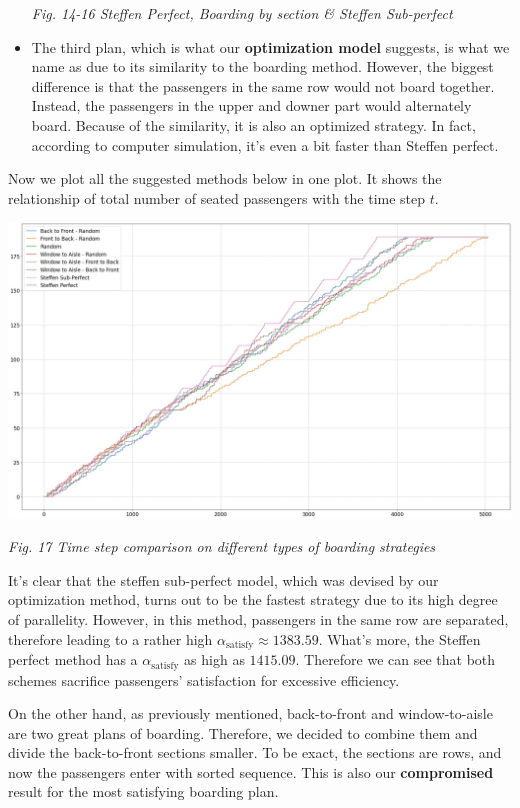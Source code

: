 \documentclass{article}
\theoremstyle{definition}
\theoremstyle{remark}
\numberwithin{equation}{section}
\begin{document}
\begin{itemize}
\begin{center}
			\small\textit{Fig. 14-16 Steffen Perfect, Boarding by section \& Steffen Sub-perfect}
		\end{center}

		\item The third plan, which is what our \textbf{optimization model} suggests, is what we name as  due to its similarity to the  boarding method. However, the biggest difference is that the passengers in the same row would not board together. Instead, the passengers in the upper and downer part would alternately board. Because of the similarity, it is also an optimized strategy. In fact, according to computer simulation, it's even a bit faster than Steffen perfect.
	\end{itemize}
	Now we plot all the suggested methods below in one plot. It shows the relationship of total number of seated passengers with the time step \(t\).
	\begin{center}
		\includegraphics[width = 14cm]{speed graphs on various types.jpg}

		\small\textit{Fig. 17 Time step comparison on different types of boarding strategies}
	\end{center}
	It's clear that the steffen sub-perfect model, which was devised by our optimization method, turns out to be the fastest strategy due to its high degree of parallelity. However, in this method, passengers in the same row are separated, therefore leading to a rather high \(\alpha_{\mathrm{satisfy}}\approx 1383.59\). What's more, the Steffen perfect method has a \(\alpha_{\mathrm{satisfy}}\) as high as \(1415.09\). Therefore we can see that both schemes sacrifice passengers' satisfaction for excessive efficiency.

	On the other hand, as previously mentioned, back-to-front and window-to-aisle are two great plans of boarding. Therefore, we decided to combine them and divide the back-to-front sections smaller. To be exact, the sections are rows, and now the passengers enter with sorted sequence. This is also our \textbf{compromised} result for the most satisfying boarding plan.
\end{document}
